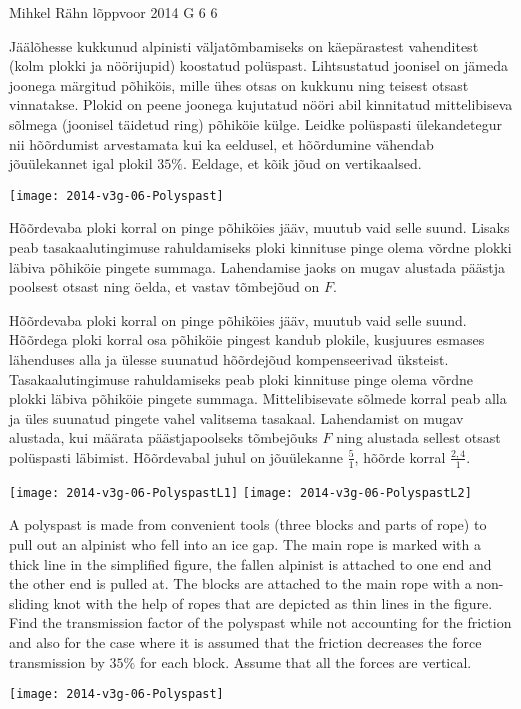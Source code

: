 {Mihkel Rähn} %
{lõppvoor} %
{2014} %
{G 6} %
{6} %
{
\ifStatement
Jäälõhesse kukkunud alpinisti väljatõmbamiseks on käepärastest vahenditest (kolm plokki ja nöörijupid) koostatud polüspast. Lihtsustatud joonisel on jämeda joonega märgitud põhiköis, mille ühes otsas on kukkunu ning teisest otsast vinnatakse. Plokid on peene joonega kujutatud nööri abil kinnitatud mittelibiseva sõlmega (joonisel täidetud ring) põhiköie külge. Leidke polüspasti ülekandetegur nii hõõrdumist arvestamata kui ka eeldusel, et hõõrdumine vähendab jõuülekannet igal plokil $35\percent$. Eeldage, et kõik jõud on vertikaalsed.

\begin{center}
\texttt{[image: 2014-v3g-06-Polyspast]}
\end{center}
\fi


\ifHint
Hõõrdevaba ploki korral on pinge põhiköies jääv, muutub vaid selle suund. Lisaks peab tasakaalutingimuse rahuldamiseks ploki kinnituse pinge olema võrdne plokki läbiva põhiköie pingete summaga. Lahendamise jaoks on mugav alustada päästja poolsest otsast ning öelda, et vastav tõmbejõud on $F$.
\fi


\ifSolution
Hõõrdevaba ploki korral on pinge põhiköies jääv, muutub vaid selle suund. Hõõrdega ploki korral osa põhiköie pingest kandub plokile, kusjuures esmases lähenduses alla ja ülesse suunatud hõõrdejõud kompenseerivad üksteist. Tasakaalutingimuse rahuldamiseks peab ploki kinnituse pinge olema võrdne plokki läbiva põhiköie pingete summaga. Mittelibisevate sõlmede korral peab alla ja üles suunatud pingete vahel valitsema tasakaal. Lahendamist on mugav alustada, kui määrata päästjapoolseks tõmbejõuks $F$ ning alustada sellest otsast polüspasti läbimist. Hõõrdevabal juhul on jõuülekanne $\frac{5}{1}$, hõõrde korral $\frac{2,4}{1}$.

\begin{center}
\texttt{[image: 2014-v3g-06-PolyspastL1]}
\texttt{[image: 2014-v3g-06-PolyspastL2]}
\end{center}
\fi


\ifEngStatement
A polyspast is made from convenient tools (three blocks and parts of rope) to pull out an alpinist who fell into an ice gap. The main rope is marked with a thick line in the simplified figure, the fallen alpinist is attached to one end and the other end is pulled at. The blocks are attached to the main rope with a non-sliding knot with the help of ropes that are depicted as thin lines in the figure. Find the transmission factor of the polyspast while not accounting for the friction and also for the case where it is assumed that the friction decreases the force transmission by $35\percent$ for each block. Assume that all the forces are vertical.
\begin{center}
\texttt{[image: 2014-v3g-06-Polyspast]}
\end{center}
\fi


}
